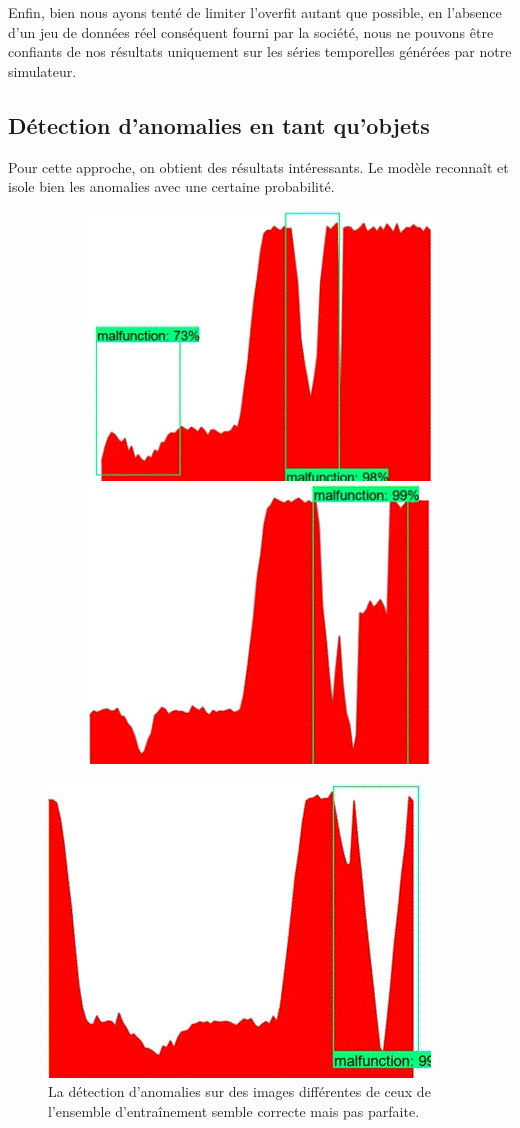 \documentclass[french]{article}
\theoremstyle{mytheoremstyle}
\theoremstyle{mytheoremstyle}
\theoremstyle{myproblemstyle}
\begin{document}
    Enfin, bien nous ayons tenté de limiter l'overfit autant que possible, en l'absence d'un jeu de données réel conséquent fourni par la société, nous ne pouvons être confiants de nos résultats uniquement sur les séries temporelles générées par notre simulateur.
        
        
    \subsection{Détection d'anomalies en tant qu'objets}
    Pour cette approche, on obtient des résultats intéressants. Le modèle reconnaît et isole bien les anomalies avec une certaine probabilité.
    \begin{figure}[H]
        \centering
        \begin{subfigure}{\linewidth}
            \includegraphics[width=.5\textwidth]{images/od_1.png}
            \hfill
            \includegraphics[width=.5\textwidth]{images/od_2.png}
        \end{subfigure}
    \end{figure}
    \begin{figure}[H]
        \centering
        \includegraphics[width=.5\textwidth]{images/od_3.png}
        \caption{La détection d'anomalies sur des images différentes de ceux de l'ensemble d'entraînement semble correcte mais pas parfaite.}
        \label{}
    \end{figure}
\end{document}
